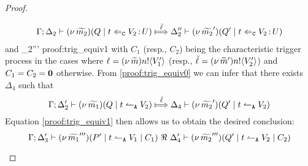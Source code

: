 \begin{proof}
\begin{enumerate}[1.]
\begin{enumerate}
							\begin{eqnarray}
							\horel{\Gamma}{\Delta_2}{\newsp{\widetilde{m_2}}{Q \Par \ftrigger{t}{V_2}{U}}}
							{\Hby{\mact{\ell}}}
							{\Delta_2''}{\newsp{\widetilde{m_2}'}{Q' \Par \ftrigger{t}{V_2}{U}}}
							\label{proof:trig_equiv0}
							\end{eqnarray}
							and
							{\fwb}
							{\Delta_2'''}{}
							{proof:trig_equiv1}
							with $C_1$ (resp., $C_2$) being the characteristic trigger process
							in the cases where $\ell = (\nu\, \widetilde{m}) n ! \langle V_1' \rangle$ (resp., $\breve{\ell} = (\nu\, \widetilde{m}') n ! \langle V_2' \rangle$)
							and $C_1 = C_2 = \mathbf{0}$ otherwise.
							From \eqref{proof:trig_equiv0} we can infer that there exists $\Delta_4$ such that
						\[
							\horel{\Gamma}{\Delta_2'}{\newsp{\widetilde{m_1}}{Q \Par \ntrigger{t}{V_2}}}
							{\Hby{\mact{\ell}}}
							{\Delta_4}{\newsp{\widetilde{m_2}'}{Q' \Par \ntrigger{t}{V_2}}}
						\]
							Equation \eqref{proof:trig_equiv1} then allows us to obtain the desired conclusion:
						\[
							\Gamma; \Delta_3' \vdash (\nu\, \widetilde{m_1}''')(P' \;|\; t \leftharpoonup_\mathtt{A} V_1 \;|\; C_1) \ \Re\  \Delta_4' \vdash{(\nu\, \widetilde{m_2}''')(Q' \;|\;t \leftharpoonup_\mathtt{A} V_2 \;|\;C_2)}
						\]


\end{enumerate}
\end{enumerate}
\end{proof}
